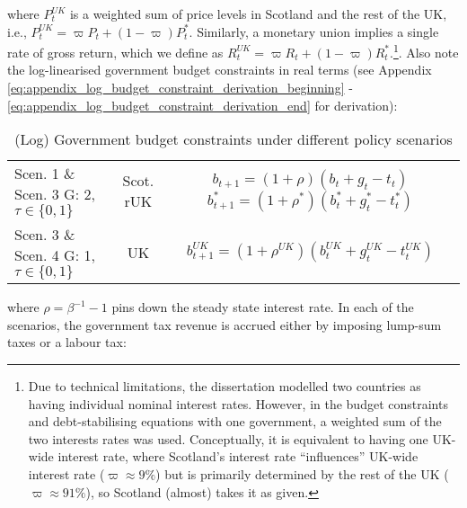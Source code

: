 where $P^{UK}_t$ is a weighted sum of price levels in Scotland and the rest of the UK, i.e., $P^{UK}_t = \varpi P_t + (1-\varpi)P^*_t$. Similarly, a monetary union implies a single rate of gross return, which we define as $R^{UK}_t = \varpi R_t + (1-\varpi)R^*_t$.\footnote{Due to technical limitations, the dissertation modelled two countries as having individual nominal interest rates. However, in the budget constraints and debt-stabilising equations with one government, a weighted sum of the two interests rates was used. Conceptually, it is equivalent to having one UK-wide interest rate, where Scotland's interest rate ``influences'' UK-wide interest rate ($\varpi \approx 9\%$) but is primarily determined by the rest of the UK ($\varpi \approx 91\%$), so Scotland (almost) takes it as given.}. Also note the log-linearised government budget constraints in real terms (see Appendix \ref{eq:appendix_log_budget_constraint_derivation_beginning} - \ref{eq:appendix_log_budget_constraint_derivation_end} for derivation):
\begin{table}[H]
    \renewcommand{\arraystretch}{2}
    \centering
    \begin{tabular}{l|c|c}
    \makecell{Scen. 1 \& Scen. 3\\ G: 2, $\tau \in \{0, 1\}$} & \makecell{Scot. \\ rUK } & 
        \makecell{
            $b_{t+1} = (1 + \rho)(b_t + g_t - t_t)$\\
            $b^*_{t+1} = (1 + \rho^*)(b^*_t + g^*_t - t^*_t)$
        }  \\ 
    \makecell{Scen. 3 \& Scen. 4\\ G: 1, $\tau \in \{0, 1\}$} & UK & 
    $b^{UK}_{t+1} = (1 + \rho^{UK})(b^{UK}_t + g^{UK}_t - t^{UK}_t)$
    \end{tabular}
    \caption{(Log) Government budget constraints under different policy scenarios}
\end{table}
where $\rho = \beta^{-1} - 1$ pins down the steady state interest rate. In each of the scenarios, the government tax revenue is accrued either by imposing lump-sum taxes or a labour tax:
